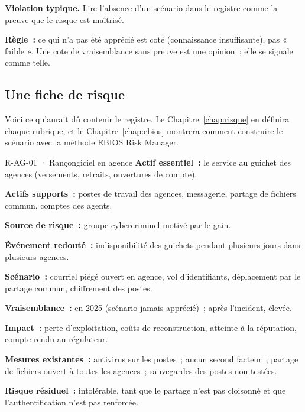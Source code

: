 \begin{boxalert}
\textbf{Violation typique.} Lire l'absence d'un scénario dans le registre
comme la preuve que le risque est maîtrisé.

\smallskip
\textbf{Règle~:} ce qui n'a pas été apprécié est coté \NEK{} (connaissance
insuffisante), pas « faible ». Une cote de vraisemblance sans preuve est une
opinion~; elle se signale comme telle.
\end{boxalert}

\subsection{Une fiche de risque}

Voici ce qu'aurait dû contenir le registre. Le Chapitre~\ref{chap:risque}
en définira chaque rubrique, et le Chapitre~\ref{chap:ebios} montrera comment
construire le scénario avec la méthode EBIOS Risk Manager.

\begin{boxobjet}{R-AG-01 · Rançongiciel en agence}
\textbf{Actif essentiel~:} le service au guichet des agences (versements,
retraits, ouvertures de compte).

\textbf{Actifs supports~:} postes de travail des agences, messagerie,
partage de fichiers commun, comptes des agents.

\textbf{Source de risque~:} groupe cybercriminel motivé par le gain.

\textbf{Événement redouté~:} indisponibilité des guichets pendant plusieurs
jours dans plusieurs agences.

\textbf{Scénario~:} courriel piégé ouvert en agence, vol d'identifiants,
déplacement par le partage commun, chiffrement des postes.

\textbf{Vraisemblance~:} \NEK{} en 2025 (scénario jamais apprécié)~; après
l'incident, élevée.

\textbf{Impact~:} perte d'exploitation, coûts de reconstruction, atteinte à la
réputation, compte rendu au régulateur.

\textbf{Mesures existantes~:} antivirus sur les postes~; aucun second facteur~;
partage de fichiers ouvert à toutes les agences~; sauvegardes des postes non
testées.

\textbf{Risque résiduel~:} intolérable, tant que le partage n'est pas
cloisonné et que l'authentification n'est pas renforcée.
\end{boxobjet}

